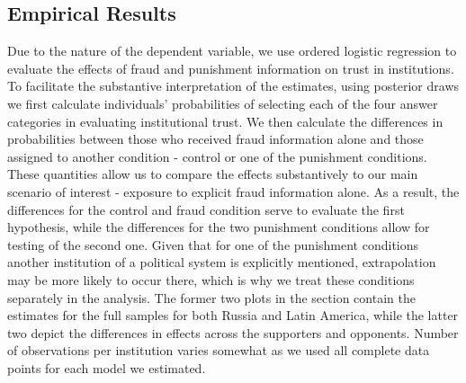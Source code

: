 \documentclass[11pt, ngerman,english,a4]{article}
\begin{document}
\subsection*{Empirical Results}

Due to the nature of the dependent variable, we use ordered logistic regression to evaluate the effects of fraud and punishment information on trust in institutions. To facilitate the substantive interpretation of the estimates, using posterior draws we first calculate individuals' probabilities of selecting each of the four answer categories in evaluating institutional trust. We then calculate the differences in probabilities between those who received fraud information alone and those assigned to another condition - control or one of the punishment conditions. These quantities allow us to compare the effects substantively to our main scenario of interest - exposure to explicit fraud information alone. As a result, the differences for the control and fraud condition serve to evaluate the first hypothesis, while the differences for the two punishment conditions allow for testing of the second one. Given that for one of the punishment conditions another institution of a political system is explicitly mentioned, extrapolation may be more likely to occur there, which is why we treat these conditions separately in the analysis. The former two plots in the section contain the estimates for the full samples for both Russia and Latin America, while the latter two depict the differences in effects across the supporters and opponents. Number of observations per institution varies somewhat as we used all complete data points for each model we estimated. 


\end{document}
